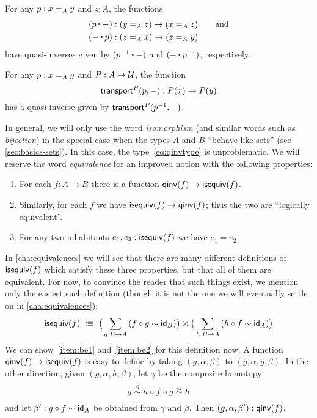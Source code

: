 \begin{eg}\label{eg:concatequiv}
  For any $p:\id[A]xy$ and $z:A$, the functions
  \begin{align*}
    (p\ct -)&:(\id[A]yz) \to (\id[A]xz) \qquad\text{and}\\
    (-\ct p)&:(\id[A]zx) \to (\id[A]zy)
  \end{align*}
  have quasi-inverses given by $(\opp p \ct -)$ and $(-\ct \opp p)$, respectively.
\end{eg}

\begin{eg}\label{thm:transportequiv}
  For any $p:\id[A]xy$ and $P:A\to\type$, the function
  \[\transfib{P}{p}{-}:P(x) \to P(y)\]
  has a quasi-inverse given by $\transfib{P}{\opp p}{-}$.
\end{eg}

In general, we will only use the word \emph{isomorphism} (and similar words such as \emph{bijection}) in the special case when the types $A$ and $B$ ``behave like sets'' (see \autoref{sec:basics-sets}).
In this case, the type~\eqref{eq:qinvtype} is unproblematic.
We will reserve the word \emph{equivalence} for an improved notion with the following properties:
\begin{enumerate}
\item For each $f:A\to B$ there is a function $\qinv(f) \to \isequiv (f)$.\label{item:be1}
\item Similarly, for each $f$ we have $\isequiv (f) \to \qinv(f)$; thus the two are ``logically equivalent''.\label{item:be2}
\item For any two inhabitants $e_1,e_2:\isequiv(f)$ we have $e_1=e_2$.\label{item:be3}
\end{enumerate}
In \autoref{cha:equivalences} we will see that there are many different definitions of $\isequiv(f)$ which satisfy these three properties, but that all of them are equivalent.
For now, to convince the reader that such things exist, we mention only the easiest such definition (though it is not the one we will eventually settle on in \autoref{cha:equivalences}):
\begin{equation}
  \isequiv(f) \;\defeq\;
  \big(\sm{g:B\to A} (f\circ g \htpy \idfunc[B])\big)
  \times
  \big(\sm{h:B\to A} (h\circ f \htpy \idfunc[A])\big)\label{eq:isequiv-invertible}
\end{equation}
We can show~\ref{item:be1} and~\ref{item:be2} for this definition now.
A function $\qinv(f) \to \isequiv (f)$ is easy to define by taking $(g,\alpha,\beta)$ to $(g,\alpha,g,\beta)$.
In the other direction, given $(g,\alpha,h,\beta)$, let $\gamma$ be the composite homotopy
\[ g \overset{\beta}{\htpy} h\circ f\circ g \overset{\alpha}{\htpy} h \]
and let $\beta':g\circ f\htpy \idfunc[A]$ be obtained from $\gamma$ and $\beta$.
Then $(g,\alpha,\beta'):\qinv(f)$.

